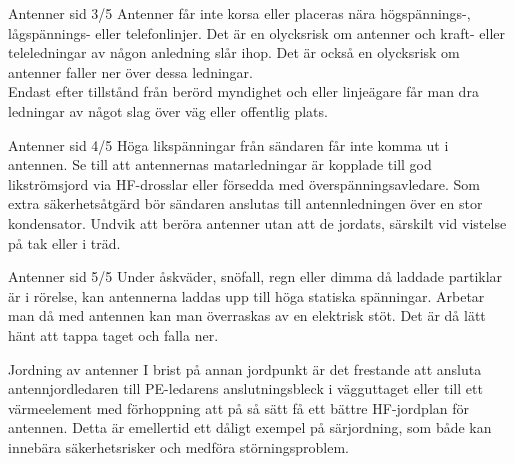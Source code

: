 \documentclass{beamer}
\begin{document}
\begin{frame}{Antenner sid 3/5}
Antenner får inte korsa eller placeras nära hög\-spännings-, låg\-spännings- eller
telefonlinjer.
Det är en olycksrisk om antenner och kraft- eller teleledningar av någon
anledning slår ihop.
Det är också en olycksrisk om antenner faller ner över dessa ledningar.\\
\vspace{5mm}
Endast efter tillstånd från berörd myndighet och eller linjeägare får
man dra ledningar av något slag över väg eller offentlig plats.
\end{frame}

\begin{frame}{Antenner sid 4/5}
Höga likspänningar från sändaren får inte komma ut i antennen.
Se till att antennernas matarledningar är kopplade till god likströmsjord
via HF-drosslar eller försedda med överspänningsavledare.
Som extra säkerhetsåtgärd bör sändaren anslutas till antennledningen över en
stor kondensator.
Undvik att beröra antenner utan att de jordats, särskilt vid vistelse
på tak eller i träd.
\end{frame}

\begin{frame}{Antenner sid 5/5}
Under åskväder, snöfall, regn eller dimma då laddade partiklar är i
rörelse, kan antennerna laddas upp till höga statiska spänningar.
Arbetar man då med antennen kan man överraskas av en elektrisk stöt.
Det är då lätt hänt att tappa taget och falla ner.
\end{frame}

\begin{frame}{Jordning av antenner}
I brist på annan jordpunkt är det frestande att ansluta antennjordledaren till
PE-ledarens anslutningsbleck i vägguttaget eller till ett värmeelement med
förhoppning att på så sätt få ett bättre HF-jordplan för antennen.
Detta är emellertid ett dåligt exempel på särjordning, som både kan innebära
säkerhetsrisker och medföra störningsproblem.
\end{frame}
\end{document}
